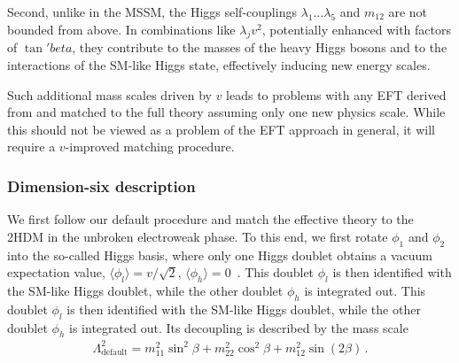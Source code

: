 Second, unlike in the MSSM, the Higgs self-couplings
$\lambda_1 \dots \lambda_5$ and $m_{12}$ are not bounded from
above. In combinations like $\lambda_j v^2$, potentially enhanced with
factors of $\tan 'beta$, they contribute to the masses of the heavy
Higgs bosons and to the interactions of the SM-like Higgs state,
effectively inducing new energy scales.

Such additional mass scales driven by $v$ leads to
problems with any EFT derived from and matched to the full theory
assuming only one new physics scale. While this should not be viewed
as a problem of the EFT approach in general, it will require a
$v$-improved matching procedure.



\subsubsection{Dimension-six description}

We first follow our default procedure and match the effective theory
to the 2HDM in the unbroken electroweak phase. To this end, we first
rotate $\phi_1$ and $\phi_2$ into the so-called Higgs basis, where
only one Higgs doublet obtains a vacuum expectation value,
$\langle \phi_l \rangle = v/\sqrt{2}$,
$\langle \phi_h \rangle = 0$~\cite{Glashow:1976nt, Davidson:2005cw}.
This doublet $\phi_l$ is then identified with the SM-like Higgs
doublet, while the other doublet $\phi_h$ is integrated out. This
doublet $\phi_l$ is then identified with the SM-like Higgs doublet,
while the other doublet $\phi_h$ is integrated out.  Its decoupling is
described by the mass scale
%
\begin{align}
  \Lambda_{\text{default}}^2 = m^2_{11}\sin^2\beta + m^2_{22}\cos^2\beta + m^2_{12} \sin (2\beta) \,.
\end{align}

